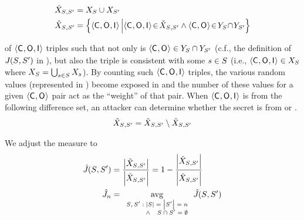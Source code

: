 \begin{align}
\check{X}_{{S_{}},{S_{}'}}& =
X_{S_{}} \cup
X_{S_{}'}\nonumber\\
\hat{X}_{{S_{}},{S_{}'}}
&= \left\{\langle\mathsf{C}_{}, \mathsf{O}_{}, \mathsf{I}_{}\rangle \left| 
  \langle\mathsf{C}_{}, \mathsf{O}_{}, \mathsf{I}_{}\rangle\!\in\! \check{X}_{{S_{}},{S_{}'}}
  \wedge\langle\mathsf{C}_{}, \mathsf{O}_{} \rangle \!\in\! Y_{S_{}} \!\cap\! Y_{S_{}'}
\right.\!\right\}
\nonumber
\end{align}

of $\langle \mathsf{C}_{}, \mathsf{O}_{}, \mathsf{I}_{} \rangle$ triples such that
not only is $\langle \mathsf{C}_{}, \mathsf{O}_{} \rangle \in
Y_{S_{}} \cap
Y_{S_{}'}$ (c.f., the definition of
$J_{}(S_{}, S_{}')$ in
), but also the triple is consistent with some
$s \in S_{}$ (i.e., $\langle\mathsf{C}_{}, \mathsf{O}_{},
\mathsf{I}_{}\rangle \in X_{S_{}}$ where
$X_{S_{}} = \bigcup_{s
  \in S_{}} X_{s}$).  By counting
such $\langle \mathsf{C}_{}, \mathsf{O}_{}, \mathsf{I}_{} \rangle$ triples, the
various random values (represented in \AIIFn{}) become exposed in
\possibleTriplesIntersect{\secretsSet{}}{\secretsSetAlt{}} and the
number of these values for a given $\langle \mathsf{C}_{}, \mathsf{O}_{}
\rangle$ pair act as the ``weight'' of that pair. When
$\langle\mathsf{C}_{}{}, \mathsf{O}_{}, \mathsf{I}_{}\rangle$ is from the following
difference set, an attacker can determine whether the secret is from
\secretsSet{} or \secretsSetAlt{}.
\begin{align}
 \tilde{X}_{{S_{}},{S_{}'}} = \check{X}_{{S_{}},{S_{}'}}\setminus\hat{X}_{{S_{}},{S_{}'}}
\end{align}

We adjust the measure to
\begin{align}
  \JaccardRand{}(\secretsSet{}, \secretsSetAlt{})
  &= \frac{\setSize{\possibleTriplesDiff{\secretsSet{}}{\secretsSetAlt{}}}}{\setSize{\possibleTriplesUnion{\secretsSet{}}{\secretsSetAlt{}}}}
  = 1 - \frac{\setSize{\possibleTriplesIntersect{\secretsSet{}}{\secretsSetAlt{}}}}{\setSize{\possibleTriplesUnion{\secretsSet{}}{\secretsSetAlt{}}}} 
\label{eqn:jaccard}\\
\JaccardRand{\secretsSetSize}
&= \avg_{\scriptsize \begin{array}{r@{\hspace{0.25em}}r} \scriptsize \secretsSet{},\secretsSetAlt{}: & \setSize{\secretsSet{}} = \setSize{\secretsSetAlt{}} = \secretsSetSize \\ & \wedge~\hfill \secretsSet{} \cap \secretsSetAlt{} = \emptyset\end{array}}
\JaccardRand{}(\secretsSet{}, \secretsSetAlt{})
\label{dfn:jaccardRand}
\end{align}

